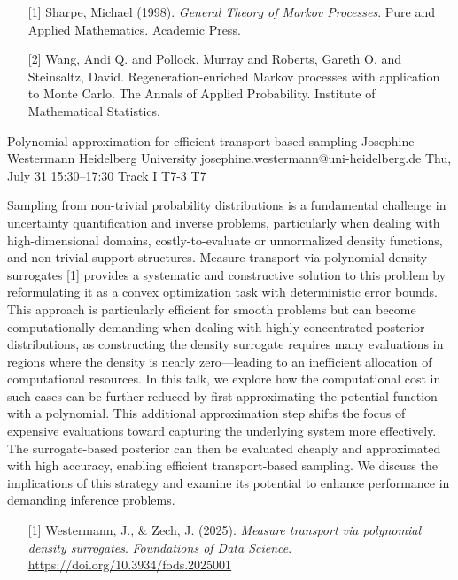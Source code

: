 \begin{talk}
\medskip

\begin{enumerate}
	\item[{[1]}] Sharpe, Michael (1998). {\it General Theory of Markov Processes}. Pure and Applied Mathematics. Academic Press.
	\item[{[2]}] Wang, Andi Q. and Pollock, Murray and Roberts, Gareth O. and Steinsaltz, David. Regeneration-enriched Markov processes with application to Monte Carlo. The Annals of Applied Probability. Institute of Mathematical Statistics.
\end{enumerate}

\end{talk}

\begin{talk}
  {Polynomial approximation for efficient transport-based sampling}%
  {Josephine Westermann}%
  {Heidelberg University}%
  {josephine.westermann@uni-heidelberg.de}%
  {}%
  {}%
  {Thu, July 31 15:30–17:30 Track I}%
  {T7-3}%
  {T7}%
  {}%
  {}

Sampling from non-trivial probability distributions is a fundamental challenge in uncertainty quantification and inverse problems, particularly when dealing with high-dimensional domains, costly-to-evaluate or unnormalized density functions, and non-trivial support structures. Measure transport via polynomial density surrogates [1] provides a systematic and constructive solution to this problem by reformulating it as a convex optimization task with deterministic error bounds. This approach is particularly efficient for smooth problems but can become computationally demanding when dealing with highly concentrated posterior distributions, as constructing the density surrogate requires many evaluations in regions where the density is nearly zero—leading to an inefficient allocation of computational resources. In this talk, we explore how the computational cost in such cases can be further reduced by first approximating the potential function with a polynomial. This additional approximation step shifts the focus of expensive evaluations toward capturing the underlying system more effectively. The surrogate-based posterior can then be evaluated cheaply and approximated with high accuracy, enabling efficient transport-based sampling. We discuss the implications of this strategy and examine its potential to enhance performance in demanding inference problems.

\medskip

\begin{enumerate}
	\item[{[1]}] Westermann, J., \& Zech, J. (2025). \textit{Measure transport via polynomial density surrogates}. \textit{Foundations of Data Science}. \url{https://doi.org/10.3934/fods.2025001}
\end{enumerate}

\end{talk}

